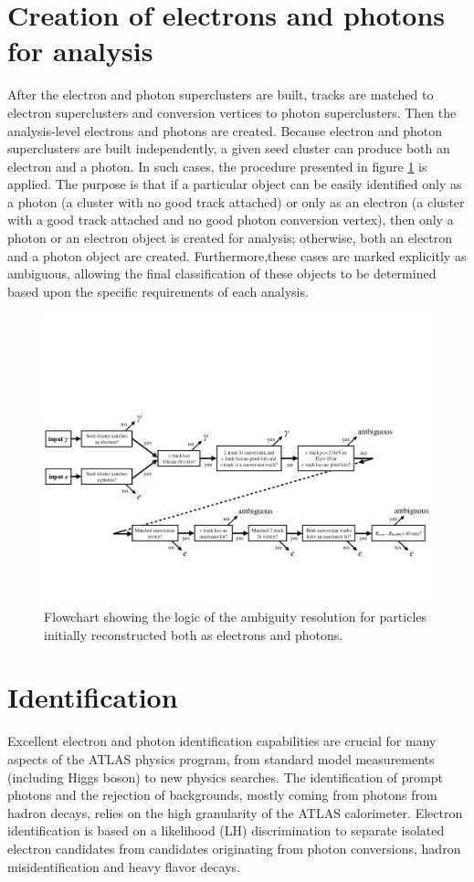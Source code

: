 \documentclass[a4paper, oneside]{book}
\begin{document}
		\section{Creation of electrons and photons for analysis}
		\cite{El ph reco}After the electron and photon superclusters are built, tracks are matched to electron superclusters and conversion vertices to photon superclusters. Then the analysis-level
		electrons and photons are created. Because electron and photon superclusters are built independently, a given seed cluster can produce both an electron and a photon. In such cases, the procedure
		presented in figure \ref{fig:el_ph_analisi} is applied. The purpose is that if a particular object can be easily identified only as a photon (a cluster with no good track attached) or only as an electron (a cluster with a good track attached and no good photon conversion vertex), then only a photon or an electron object is created for analysis; otherwise, both an electron and a photon object are created. Furthermore,these cases are marked explicitly as ambiguous, allowing the final classification of these objects to be determined based upon the specific requirements of each analysis.
		\begin{figure}
			\centering
			\includegraphics[width=0.45\textheight]{tesi_images/el_ph_analisi.png}
			\caption{Flowchart showing the logic of the ambiguity resolution for particles initially reconstructed both as electrons and photons.}
			\label{fig:el_ph_analisi}
		\end{figure}
	
		\section{Identification}
		\cite{Identification}Excellent electron and photon identification capabilities are crucial for many aspects of the ATLAS physics program, from standard model measurements (including Higgs boson) to new physics searches. The identification of prompt photons and the rejection of backgrounds, mostly coming from photons from hadron decays, relies on the high granularity of the ATLAS calorimeter. Electron identification is based on a likelihood (LH) discrimination to separate isolated electron candidates from candidates originating from photon conversions, hadron misidentification and heavy flavor decays. 
\end{document}
